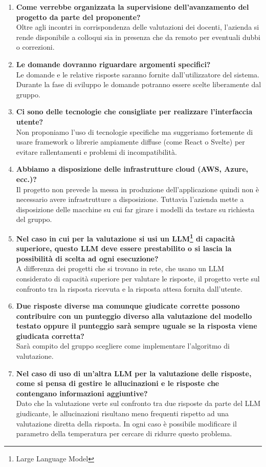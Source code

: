 \documentclass[10pt]{article}
\begin{document}
\begin{enumerate}
    \item \textbf{Come verrebbe organizzata la supervisione dell'avanzamento del progetto da parte del proponente?}\\
        Oltre agli incontri in corrispondenza delle valutazioni dei docenti, l'azienda si rende disponibile a colloqui sia in presenza che da remoto per eventuali dubbi o correzioni.
    \item \textbf{Le domande dovranno riguardare argomenti specifici?}\\
        Le domande e le relative risposte saranno fornite dall'utilizzatore del sistema. Durante la fase di sviluppo le domande potranno essere scelte liberamente dal gruppo.
    \item \textbf{Ci sono delle tecnologie che consigliate per realizzare l'interfaccia utente?}\\
        Non proponiamo l'uso di tecnologie specifiche ma suggeriamo fortemente di usare framework o librerie ampiamente diffuse (come React o Svelte) per evitare rallentamenti e problemi di incompatibilità.
    \item \textbf{Abbiamo a disposizione delle infrastrutture cloud (AWS, Azure, ecc.)?}\\
        Il progetto non prevede la messa in produzione dell'applicazione quindi non è necessario avere infrastrutture a disposizione. 
        Tuttavia l'azienda mette a disposizione delle macchine su cui far girare i modelli da testare su richiesta del gruppo.
    \item \textbf{Nel caso in cui per la valutazione si usi un LLM\footnote{Large Language Model} di capacità superiore, questo LLM deve essere prestabilito o si lascia la possibilità di scelta ad ogni esecuzione?}\\
        A differenza dei progetti che si trovano in rete, che usano un LLM considerato di capacità superiore per valutare le risposte, il progetto verte sul confronto tra la risposta ricevuta e la risposta attesa fornita dall'utente.
    \item \textbf{Due risposte diverse ma comunque giudicate corrette possono contribuire con un punteggio diverso alla valutazione del modello testato oppure il punteggio sarà sempre uguale se la risposta viene giudicata corretta?}\\
        Sarà compito del gruppo scegliere come implementare l'algoritmo di valutazione.
    \item \textbf{Nel caso di uso di un'altra LLM per la valutazione delle risposte, come si pensa di gestire le allucinazioni e le risposte che contengano informazioni aggiuntive?}\\
        Dato che la valutazione verte sul confronto tra due risposte da parte del LLM giudicante, le allucinazioni risultano meno frequenti rispetto ad una valutazione diretta della risposta. In ogni caso è possibile modificare il parametro della temperatura per cercare di ridurre questo problema.
\end{enumerate}
\end{document}
